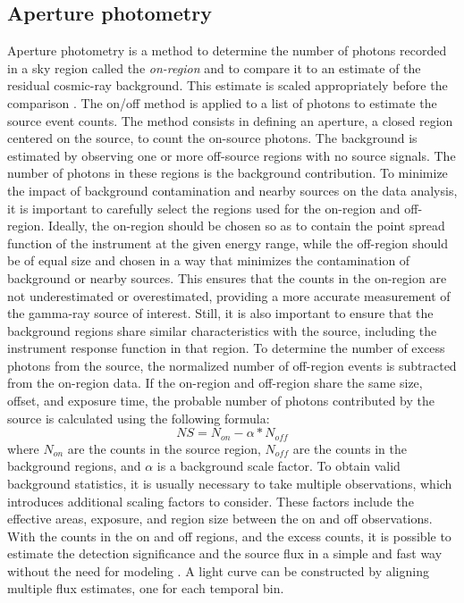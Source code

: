\subsection{Aperture photometry}
\label{ss:aperture-photometry}
Aperture photometry is a method to determine the number of photons recorded in a sky region 
called the \textit{on-region} and to compare it to an estimate of the residual cosmic-ray background. This estimate is scaled appropriately before the comparison \cite{mohrmann2019}. The on/off method is applied to a list of photons to estimate the source event counts. The method consists in defining an aperture, a closed region centered on the source, to count the on-source photons. The background is estimated by observing one or more off-source regions with no source signals. The number of photons in these regions is the background contribution. To minimize the impact of background contamination and nearby sources on the data analysis, it is important to carefully select the regions used for the on-region and off-region. Ideally, the on-region should be chosen so as to contain the point spread function of the instrument at the given energy range, while the off-region should be of equal size and chosen in a way that minimizes the contamination of background or nearby sources. This ensures that the counts in the on-region are not underestimated or overestimated, providing a more accurate measurement of the gamma-ray source of interest. Still, it is also important to ensure that the background regions share similar characteristics with the source, including the instrument response function in that region. To determine the number of excess photons from the source, the normalized number of off-region events is subtracted from the on-region data. If the on-region and off-region share the same size, offset, and exposure time, the probable number of photons contributed by the source is calculated using the following formula:
$$
NS = N_{on} - \alpha*N_{off}
$$
where $N_{on}$ are the counts in the source region, $N_{off}$ are the counts in the background regions, and $\alpha$ is a background scale factor.
To obtain valid background statistics, it is usually necessary to take multiple observations, which introduces additional scaling factors to consider. These factors include the effective areas, exposure, and region size between the on and off observations. With the counts in the on and off regions, and the excess counts, it is possible to estimate the detection significance and the source flux in a simple and fast way without the need for modeling \cite{tampieri2020real}. A light curve can be constructed by aligning multiple flux estimates, one for each temporal bin.

